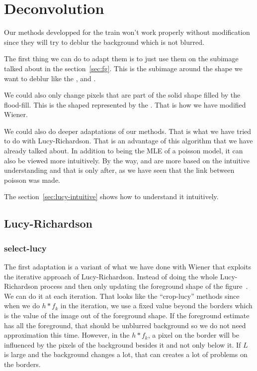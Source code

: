 \section{Deconvolution}
Our methods developped for the train won't work properly
without modification since they will try to deblur the background
which is not blurred.

The first thing we can do to adapt them is to just use them
on the subimage talked about in the section~\ref{sec:fg}.
This is the subimage around the shape we want to deblur
like the ,
 and .

We could also only change pixels that are part of the solid
shape filled by the flood-fill.
This is the shaped represented by the
.
That is how we have modified Wiener.

We could also do deeper adaptations of our methods.
That is what we have tried to do with Lucy-Richardson.
That is an advantage of this algorithm that we have already
talked about.
In addition to being the MLE of a poisson model,
it can also be viewed more intuitively.
By the way,
\cite{richardson1972bayesian} and \cite{lucy1974iterative}
are more based on the intuitive understanding and that is
only after, as we have seen that the link between poisson
was made.

The section~\ref{sec:lucy-intuitive} shows how to understand
it intuitively.

\subsection{Lucy-Richardson}
\subsubsection{select-lucy}
The first adaptation is a variant of what we have done
with Wiener that exploits the iterative approach of Lucy-Richardson.
Instead of doing the whole Lucy-Richardson process and then
only updating the foreground shape of the figure~.
We can do it at each iteration.
That looks like the ``crop-lucy'' methods since when we do
$h * f_k$ in the iteration, we use a fixed value beyond the borders
which is the value of the image out of the foreground shape.
If the foreground estimate has all the foreground,
that should be unblurred background so we do not need approximation
this time.
However, in the $h * f_k$, a pixel on the border will be influenced
by the pixels of the background besides it and not only below it.
If $L$ is large and the background changes a lot, that can
creates a lot of problems on the borders.

